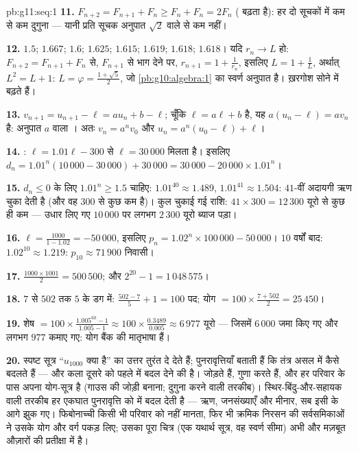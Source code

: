 \begin{solution}{pb:g11:seq:1}
\textbf{11.} $F_{n+2} = F_{n+1} + F_n \geq F_n + F_n = 2F_n$ ( बढ़ता है): हर दो सूचकों में कम से कम दुगुना ---
यानी प्रति सूचक अनुपात $\sqrt2$ वाले  से कम नहीं।

\textbf{12.} $1.5$; $1.667$; $1.6$; $1.625$; $1.615$; $1.619$; $1.618$; $1.618$। यदि
$r_n \to L$ हो: $F_{n+2} = F_{n+1} + F_n$ से, $F_{n+1}$ से भाग देने पर, $r_{n+1} = 1 + \frac{1}{r_n}$, इसलिए $L = 1 + \frac1L$, अर्थात्
$L^2 = L + 1$: $L = \varphi = \frac{1 + \sqrt5}{2}$, जो \cref{pb:g10:algebra:1} का स्वर्ण अनुपात है। ख़रगोश सोने में बढ़ते हैं।

\textbf{13.} $v_{n+1} = u_{n+1} - \ell = a u_n + b - \ell$; चूँकि $\ell = a\ell + b$ है, यह $a(u_n - \ell) = a v_n$ है: अनुपात $a$ वाला
। अतः $v_n = a^n v_0$ और $u_n = a^n (u_0 - \ell) + \ell$।

\textbf{14.} : $\ell = 1.01\ell - 300$ से $\ell = 30\,000$ मिलता है। इसलिए $d_n = 1.01^n (10\,000 - 30\,000) + 30\,000
= 30\,000 - 20\,000 \times 1.01^n$।

\textbf{15.} $d_n \leq 0$ के लिए $1.01^n \geq 1.5$ चाहिए: $1.01^{40} \approx 1.489$, $1.01^{41} \approx 1.504$: $41$-वीं अदायगी ऋण
चुका देती है (और वह $300$ से कुछ कम है)। कुल चुकाई गई राशि: $41 \times 300 = 12\,300$ यूरो से
कुछ ही कम --- उधार लिए गए $10\,000$ पर लगभग $2\,300$ यूरो ब्याज पड़ा।

\textbf{16.}  $\ell = \frac{1000}{1 - 1.02} =
-50\,000$, इसलिए $p_n = 1.02^n \times 100\,000 - 50\,000$। $10$ वर्षों बाद: $1.02^{10} \approx 1.219$: $p_{10} \approx 71\,900$
निवासी।

\textbf{17.} $\frac{1000 \times 1001}{2} = 500\,500$; और $2^{20} - 1 = 1\,048\,575$।

\textbf{18.} $7$ से $502$ तक $5$ के डग में: $\frac{502 - 7}{5} + 1 = 100$ पद; योग $= 100 \times \frac{7 + 502}{2} = 25\,450$।

\textbf{19.} शेष $= 100 \times \frac{1.005^{60} - 1}
{1.005 - 1} \approx 100 \times \frac{0.3489}{0.005} \approx
6\,977$ यूरो --- जिसमें $6\,000$ जमा किए गए और लगभग $977$ कमाए
गए:  योग बैंक की मातृभाषा हैं।

\textbf{20.} स्पष्ट सूत्र ``$u_{1000}$ क्या है'' का उत्तर तुरंत दे देते हैं;
पुनरावृत्तियाँ बताती हैं कि तंत्र असल में कैसे बदलते हैं --- और कला दूसरे को
पहले में बदल देने की है।  जोड़ते हैं,  गुणा करते हैं,
और हर परिवार के पास अपना योग-सूत्र है (गाउस की जोड़ी बनाना; दुगुना करने वाली
तरकीब)। स्थिर-बिंदु-और-सहायक वाली तरकीब हर एकघात पुनरावृत्ति को  में
बदल देती है --- ऋण, जनसंख्याएँ और मीनार, सब इसी के आगे झुक गए। फिबोनाच्ची
किसी भी परिवार को नहीं मानता, फिर भी क्रमिक निरसन की सर्वसमिकाओं ने उसके योग
और वर्ग पकड़ लिए; उसका पूरा चित्र (एक यथार्थ सूत्र, वह स्वर्ण सीमा) अभी और
मज़बूत औज़ारों की प्रतीक्षा में है।
\end{solution}
